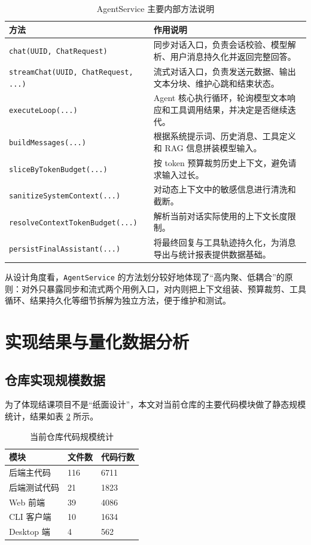 \documentclass[12pt,a4paper,UTF8]{ctexart}
\begin{document}
\begin{table}[H]
    \centering
    \caption{AgentService 主要内部方法说明}
    \label{tab:agentservice}
    \begin{tabular}{p{4.2cm}p{7.2cm}}
        \toprule
        方法 & 作用说明 \\
        \midrule
        \texttt{chat(UUID, ChatRequest)} & 同步对话入口，负责会话校验、模型解析、用户消息持久化并返回完整回答。 \\
        \texttt{streamChat(UUID, ChatRequest, ...)} & 流式对话入口，负责发送元数据、输出文本分块、维护心跳和结束状态。 \\
        \texttt{executeLoop(...)} & Agent 核心执行循环，轮询模型文本响应和工具调用结果，并决定是否继续迭代。 \\
        \texttt{buildMessages(...)} & 根据系统提示词、历史消息、工具定义和 RAG 信息拼装模型输入。 \\
        \texttt{sliceByTokenBudget(...)} & 按 token 预算裁剪历史上下文，避免请求输入过长。 \\
        \texttt{sanitizeSystemContext(...)} & 对动态上下文中的敏感信息进行清洗和截断。 \\
        \texttt{resolveContextTokenBudget(...)} & 解析当前对话实际使用的上下文长度限制。 \\
        \texttt{persistFinalAssistant(...)} & 将最终回复与工具轨迹持久化，为消息导出与统计报表提供数据基础。 \\
        \bottomrule
    \end{tabular}
\end{table}

从设计角度看，\texttt{AgentService} 的方法划分较好地体现了“高内聚、低耦合”的原则：对外只暴露同步和流式两个用例入口，对内则把上下文组装、预算裁剪、工具循环、结果持久化等细节拆解为独立方法，便于维护和测试。

\section{实现结果与量化数据分析}

\subsection{仓库实现规模数据}
为了体现结课项目不是“纸面设计”，本文对当前仓库的主要代码模块做了静态规模统计，结果如表 \ref{tab:loc} 所示。

\begin{table}[H]
    \centering
    \caption{当前仓库代码规模统计}
    \label{tab:loc}
    \begin{tabular}{p{2.2cm}p{2.2cm}p{2.2cm}}
        \toprule
        模块 & 文件数 & 代码行数 \\
        \midrule
        后端主代码 & 116 & 6711 \\
        后端测试代码 & 21 & 1823 \\
        Web 前端 & 39 & 4086 \\
        CLI 客户端 & 10 & 1634 \\
        Desktop 端 & 4 & 562 \\
        \bottomrule
    \end{tabular}
\end{table}
\end{document}
